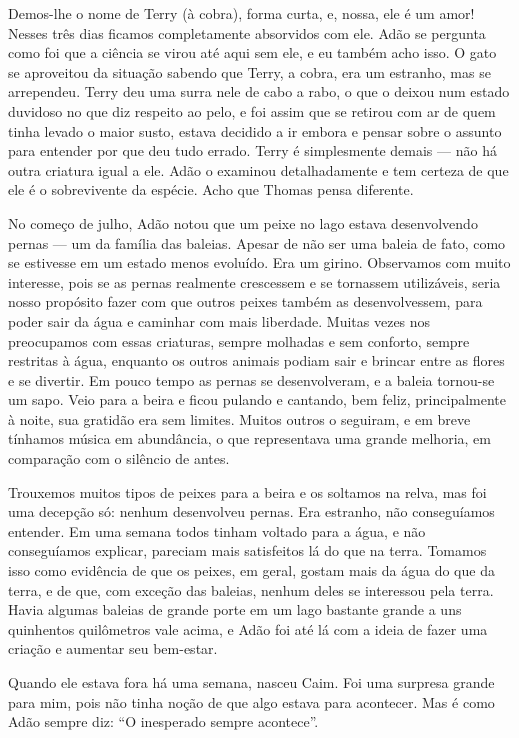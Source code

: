  Demos-lhe o nome de Terry (à cobra), forma curta, e,
nossa, ele é um amor! Nesses três dias ficamos completamente absorvidos com ele.
Adão se pergunta como foi que a ciência se virou até aqui sem ele, e eu também
acho isso. O gato se aproveitou da situação sabendo que Terry, a cobra, era um
estranho, mas se arrependeu. Terry deu uma surra nele de cabo a rabo, o que o
deixou num estado duvidoso no que diz respeito ao pelo, e foi assim que se
retirou com ar de quem tinha levado o maior susto, estava decidido a
ir embora e pensar sobre o assunto para entender por que deu tudo errado. Terry
é simplesmente demais --- não há outra criatura igual a ele. Adão o examinou
detalhadamente e tem certeza de que ele é o sobrevivente da espécie. Acho que Thomas
pensa diferente.

 No começo de julho, Adão notou que um peixe no lago estava
desenvolvendo pernas --- um da família das baleias. Apesar de não ser uma
baleia de fato, como se estivesse em um estado menos evoluído. Era um girino.
Observamos com muito interesse, pois se as pernas realmente crescessem e se
tornassem utilizáveis, seria nosso propósito fazer com que outros peixes também as 
desenvolvessem, para poder sair da água e caminhar com mais liberdade.
Muitas vezes nos preocupamos com essas criaturas, sempre molhadas e sem conforto,
sempre restritas à água, enquanto os outros animais podiam sair e brincar entre
as flores e se divertir. Em pouco tempo as pernas se desenvolveram, e a baleia
tornou-se um sapo. Veio para a beira e ficou pulando e cantando, bem feliz,
principalmente à noite, sua gratidão era sem limites. Muitos outros o seguiram, e
em breve tínhamos música em abundância, o que representava uma grande melhoria,
em comparação com o silêncio de antes.

Trouxemos muitos tipos de peixes para a beira e os soltamos na relva, mas foi uma
decepção só: nenhum desenvolveu pernas. Era estranho, não conseguíamos entender.
Em uma semana todos tinham voltado para a água, e não conseguíamos explicar,
pareciam mais satisfeitos lá do que na terra. Tomamos isso como evidência de
que os peixes, em geral, gostam mais da água do que da terra, e de que, com exceção
das baleias, nenhum deles se interessou pela terra. Havia algumas baleias de grande
porte em um lago bastante grande a uns quinhentos quilômetros vale acima, e Adão foi até
lá com a ideia de fazer uma criação e aumentar seu bem-estar.

Quando ele estava fora há uma semana, nasceu Caim. Foi uma surpresa grande para
mim, pois não tinha noção de que algo estava para acontecer. Mas é como Adão sempre
diz: “O inesperado sempre acontece”.

